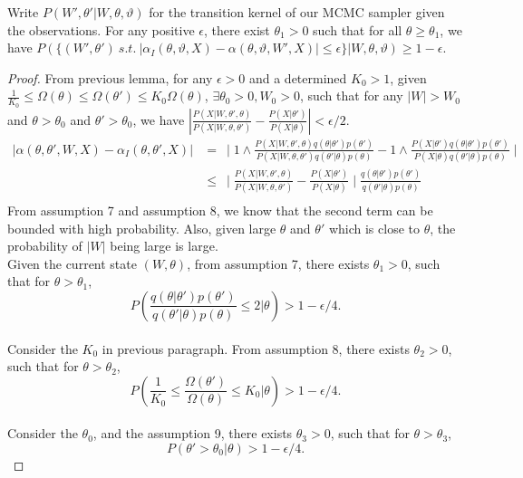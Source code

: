 \begin{proposition}
Write $P(W', \theta' | W, \theta, \vartheta)$ for the transition kernel of our MCMC sampler given the observations. For any positive $\epsilon$, there exist $\theta_1 > 0$ such that for all $\theta \ge \theta_1$, we have
  $P(\{(W', \theta') \ s.t.\ |\alpha_I(\theta,\vartheta,X) - \alpha(\theta,\vartheta,W',X)| 
  \le \epsilon\} | W, \theta, \vartheta) \ge 1-\epsilon$.%
\label{prop:mix0}
\end{proposition}
\begin{proof}
From previous lemma, for any $\epsilon > 0$ and a determined $K_0 > 1$, given $\frac{1}{K_0}  \leq \Omega(\theta) \leq \Omega(\theta') \leq K_0 \Omega(\theta)$, $\exists \theta_0 > 0, W_0 > 0$, such that for any $|W| > W_0$ and $\theta > \theta_0$ and $\theta' > \theta_0$, we have $|\frac{P(X | W, \theta' , \theta)}{P(X | W, \theta , \theta')} - \frac{P(X | \theta')}{P(X | \theta)}| < \epsilon / 2$. 
\begin{align*}
|\alpha(\theta, \theta', W, X) - \alpha_I(\theta, \theta', X)| &= \ \mid 1 \wedge \frac{P(X | W, \theta' , \theta)q(\theta | \theta')p(\theta')}{P(X | W, \theta , \theta')q(\theta' | \theta)p(\theta)} - 1 \wedge \frac{P(X | \theta')q(\theta | \theta')p(\theta')}{P(X | \theta)q(\theta' | \theta)p(\theta)} \mid \\
& \leq \ \mid \frac{P(X | W, \theta' , \theta)}{P(X | W, \theta , \theta')} - \frac{P(X | \theta')}{P(X | \theta)} \mid \frac{q(\theta | \theta')p(\theta')}{q(\theta' | \theta)p(\theta)}\\
\end{align*}
From assumption 7 and assumption 8, we know that the second term can be bounded with high probability. Also, given large $\theta$ and $\theta'$ which is close to $\theta$, the probability of $|W|$ being large is large. \\
Given the current state $(W, \theta)$, from assumption 7, there exists $\theta_1 > 0$, such that for $\theta > \theta_1$, $$P(\frac{q(\theta | \theta')p(\theta')}{q(\theta' | \theta)p(\theta)} \leq 2 | \theta) > 1 - \epsilon / 4.$$\\

Consider the $K_0 $ in previous paragraph. From assumption 8, there exists $\theta_2 > 0$, such that for $\theta > \theta_2$, $$P(\frac{1}{K_0}  \leq \frac{\Omega(\theta')}{\Omega(\theta)} \leq K_0 | \theta) > 1 - \epsilon / 4 .$$\\

Consider the $\theta_0$, and the assumption 9, there exists $\theta_3 > 0$, such that for $\theta > \theta_3$, 
$$P(\theta' > \theta_0 | \theta) > 1 - \epsilon / 4.$$


\end{proof}
